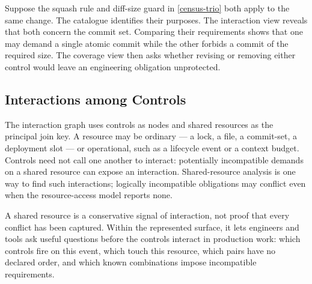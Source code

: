 

Suppose the squash rule and diff-size guard in \autoref{census-trio} both apply to the same change. The catalogue identifies their purposes. The interaction view reveals that both concern the commit set. Comparing their requirements shows that one may demand a single atomic commit while the other forbids a commit of the required size. The coverage view then asks whether revising or removing either control would leave an engineering obligation unprotected.

\subsection{Interactions among Controls}\label{heading:interactions-among-controls}


The interaction graph uses controls as nodes and shared resources as the principal join key. A resource may be ordinary --- a lock, a file, a commit-set, a deployment slot --- or operational, such as a lifecycle event or a context budget. Controls need not call one another to interact: potentially incompatible demands on a shared resource can expose an interaction. Shared-resource analysis is one way to find such interactions; logically incompatible obligations may conflict even when the resource-access model reports none.


A shared resource is a conservative signal of interaction, not proof that every conflict has been captured. Within the represented surface, it lets engineers and tools ask useful questions before the controls interact in production work: which controls fire on this event, which touch this resource, which pairs have no declared order, and which known combinations impose incompatible requirements.

